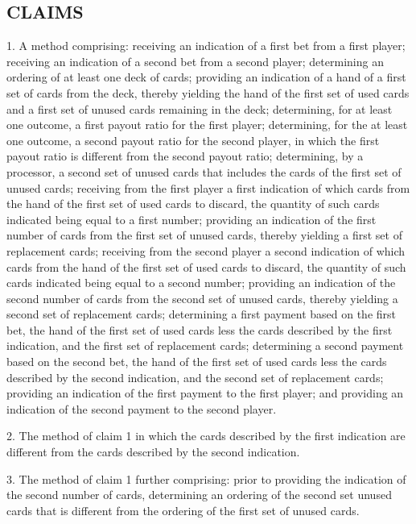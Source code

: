 \documentclass[11pt,a4paper]{article}
\begin{document}
\subsection{CLAIMS}

1. A method comprising: receiving an indication of a first bet from a first player; receiving an indication of a second bet from a second player; determining an ordering of at least one deck of cards; providing an indication of a hand of a first set of cards from the deck, thereby yielding the hand of the first set of used cards and a first set of unused cards remaining in the deck; determining, for at least one outcome, a first payout ratio for the first player; determining, for the at least one outcome, a second payout ratio for the second player, in which the first payout ratio is different from the second payout ratio; determining, by a processor, a second set of unused cards that includes the cards of the first set of unused cards; receiving from the first player a first indication of which cards from the hand of the first set of used cards to discard, the quantity of such cards indicated being equal to a first number; providing an indication of the first number of cards from the first set of unused cards, thereby yielding a first set of replacement cards; receiving from the second player a second indication of which cards from the hand of the first set of used cards to discard, the quantity of such cards indicated being equal to a second number; providing an indication of the second number of cards from the second set of unused cards, thereby yielding a second set of replacement cards; determining a first payment based on the first bet, the hand of the first set of used cards less the cards described by the first indication, and the first set of replacement cards; determining a second payment based on the second bet, the hand of the first set of used cards less the cards described by the second indication, and the second set of replacement cards; providing an indication of the first payment to the first player; and providing an indication of the second payment to the second player.

2. The method of claim 1 in which the cards described by the first indication are different from the cards described by the second indication.

3. The method of claim 1 further comprising: prior to providing the indication of the second number of cards, determining an ordering of the second set unused cards that is different from the ordering of the first set of unused cards.
\end{document}
